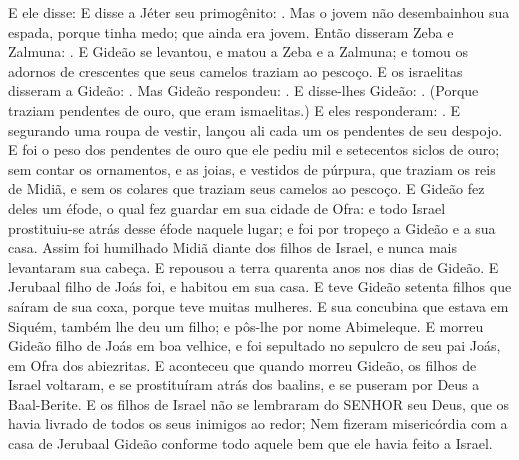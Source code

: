 {  E ele disse: 
  E disse a Jéter seu primogênito: . Mas o jovem não desembainhou sua espada, porque tinha medo; que ainda era jovem.
  Então disseram Zeba e Zalmuna: . E Gideão se levantou, e matou a Zeba e a Zalmuna; e tomou os adornos de crescentes que seus camelos traziam ao pescoço. %
  E os israelitas disseram a Gideão: .
  Mas Gideão respondeu: .
  E disse-lhes Gideão: . (Porque traziam pendentes de ouro, que eram ismaelitas.)
  E eles responderam: . E segurando uma roupa de vestir, lançou ali cada um os pendentes de seu despojo.
  E foi o peso dos pendentes de ouro que ele pediu mil e setecentos siclos de ouro; sem contar os ornamentos, e as joias, e vestidos de púrpura, que traziam os reis de Midiã, e sem os colares que traziam seus camelos ao pescoço.
  E Gideão fez deles um éfode, o qual fez guardar em sua cidade de Ofra: e todo Israel prostituiu-se atrás desse éfode naquele lugar; e foi por tropeço a Gideão e a sua casa.
  Assim foi humilhado Midiã diante dos filhos de Israel, e nunca mais levantaram sua cabeça. E repousou a terra quarenta anos nos dias de Gideão.
  E Jerubaal filho de Joás foi, e habitou em sua casa.
  E teve Gideão setenta filhos que saíram de sua coxa, porque teve muitas mulheres.
  E sua concubina que estava em Siquém, também lhe deu um filho; e pôs-lhe por nome Abimeleque.
  E morreu Gideão filho de Joás em boa velhice, e foi sepultado no sepulcro de seu pai Joás, em Ofra dos abiezritas.
  E aconteceu que quando morreu Gideão, os filhos de Israel voltaram, e se prostituíram atrás dos baalins, e se puseram por Deus a Baal-Berite.
  E os filhos de Israel não se lembraram do SENHOR seu Deus, que os havia livrado de todos os seus inimigos ao redor;
  Nem fizeram misericórdia com a casa de Jerubaal Gideão conforme todo aquele bem que ele havia feito a Israel.
\par }

